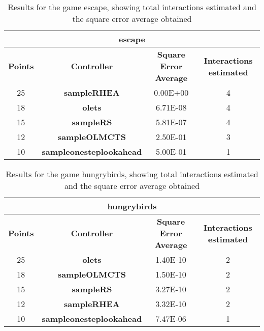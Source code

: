 \begin{table*}[!t]
\begin{center}
\begin{adjustbox}{width=1\textwidth}
\begin{tabular}{|c|c|c|c|}
\hline
\multicolumn{4}{|c|}{\textbf{escape}}\\
\hline
\textbf{Points} & \textbf{Controller} & \textbf{Square Error Average} & \textbf{Interactions estimated}\\
\hline
25 & \textbf{sampleRHEA} & 0.00E+00 & 4
 \\
\hline
18 & \textbf{olets} & 6.71E-08 & 4
 \\
\hline
15 & \textbf{sampleRS} & 5.81E-07 & 4
 \\
\hline
12 & \textbf{sampleOLMCTS} & 2.50E-01 & 3
 \\
\hline
10 & \textbf{sampleonesteplookahead} & 5.00E-01 & 1
 \\
\hline
\end{tabular}
\end{adjustbox}
\caption{Results for the game escape, showing total interactions estimated and the square error average obtained}
\label{tab:weights}
\end{center}
\end{table*}
\begin{table*}[!t]
\begin{center}
\begin{adjustbox}{width=1\textwidth}
\begin{tabular}{|c|c|c|c|}
\hline
\multicolumn{4}{|c|}{\textbf{hungrybirds}}\\
\hline
\textbf{Points} & \textbf{Controller} & \textbf{Square Error Average} & \textbf{Interactions estimated}\\
\hline
25 & \textbf{olets} & 1.40E-10 & 2
 \\
\hline
18 & \textbf{sampleOLMCTS} & 1.50E-10 & 2
 \\
\hline
15 & \textbf{sampleRS} & 3.27E-10 & 2
 \\
\hline
12 & \textbf{sampleRHEA} & 3.32E-10 & 2
 \\
\hline
10 & \textbf{sampleonesteplookahead} & 7.47E-06 & 1
 \\
\hline
\end{tabular}
\end{adjustbox}
\caption{Results for the game hungrybirds, showing total interactions estimated and the square error average obtained}
\label{tab:weights}
\end{center}
\end{table*}
